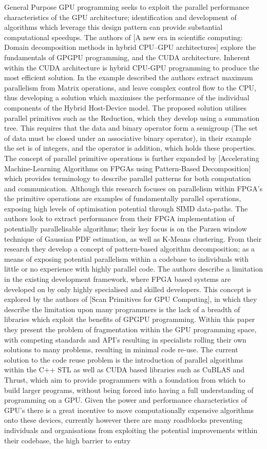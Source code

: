 General Purpose GPU programming seeks to exploit the parallel performance characteristics of the GPU architecture; identification and development of algorithms which leverage this design pattern can provide substantial computational speedups. The authors of [A new era in scientific computing: Domain decomposition methods in hybrid CPU–GPU architectures] explore the fundamentals of GPGPU programming, and the CUDA architecture. Inherent within the CUDA architecture is hybrid CPU-GPU programming to produce the most efficient solution. In the example described the authors extract maximum parallelism from Matrix operations, and leave complex control flow to the CPU, thus developing a solution which maximises the performance of the individual components of the Hybrid Host-Device model. The proposed solution utilises parallel primitives such as the Reduction, which they develop using a summation tree. This requires that the data and binary operator form a semigroup (The set of data must be closed under an associative binary operator), in their example the set is of integers, and the operator is addition, which holds these properties. The concept of parallel primitive operations is further expanded by [Accelerating Machine-Learning Algorithms on FPGAs using Pattern-Based Decomposition] which provides terminology to describe parallel patterns for both computation and communication. Although this research focuses on parallelism within FPGA’s the primitive operations are examples of fundamentally parallel operations, exposing high levels of optimisation potential through SIMD data-paths. The authors look to extract performance from their FPGA implementation of potentially parallelisable algorithms; their key focus is on the Parzen window technique of Gaussian PDF estimation, as well as K-Means clustering. From their research they develop a concept of pattern-based algorithm decomposition; as a means of exposing potential parallelism within a codebase to individuals with little or no experience with highly parallel code. The authors describe a limitation in the existing development framework, where FPGA based systems are developed on by only highly specialised and skilled developers. This concept is explored by the authors of [Scan Primitives for GPU Computing], in which they describe the limitation upon many programmers is the lack of a breadth of libraries which exploit the benefits of GPGPU programming. Within this paper they present the problem of fragmentation within the GPU programming space, with competing standards and API’s resulting in specialists rolling their own solutions to many problems, resulting in minimal code re-use. The current solution to the code reuse problem is the introduction of parallel algorithms within the C++ STL as well as CUDA based libraries such as CuBLAS and Thrust, which aim to provide programmers with a foundation from which to build larger programs, without being forced into having a full understanding of programming on a GPU. Given the power and performance characteristics of GPU’s there is a great incentive to move computationally expensive algorithms onto these devices, currently however there are many roadblocks preventing individuals and organisations from exploiting the potential improvements within their codebase, the high barrier to entry 